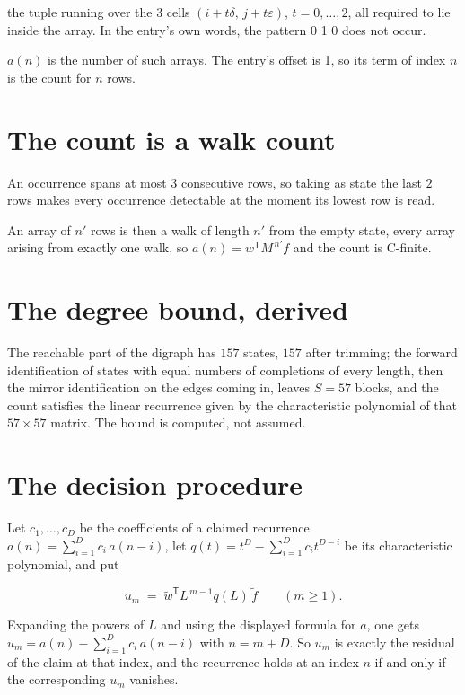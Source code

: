 \documentclass[11pt]{article}
\theoremstyle{definition}
\begin{document}
the tuple running over the $3$ cells $(i+t\delta,\,j+t\varepsilon)$, $t = 0,\dots,2$, all required to lie inside the array. In the entry's own words, the pattern 0 1 0 does not occur.

$a(n)$ is the number of such arrays. The entry's offset is 1, so its term of index $n$ is the count for $n$ rows.

\section{The count is a walk count}

An occurrence spans at most $3$ consecutive rows, so taking as state the last $2$ rows makes every occurrence detectable at the moment its lowest row is read.

An array of $n'$ rows is then a walk of length $n'$ from the empty state, every array arising from exactly one walk, so $a(n) = w^{\mathsf T}M^{\,n'}f$ and the count is C-finite.

\section{The degree bound, derived}

The reachable part of the digraph has $157$ states, $157$ after trimming; the forward identification of states with equal numbers of completions of every length, then the mirror identification on the edges coming in, leaves $S = 57$ blocks, and the count satisfies the linear recurrence given by the characteristic polynomial of that $57\times57$ matrix. The bound is computed, not assumed.

\section{The decision procedure}

Let $c_1,\dots,c_D$ be the coefficients of a claimed recurrence $a(n) = \sum_{i=1}^{D} c_i\,a(n-i)$, let $q(t) = t^{D} - \sum_{i=1}^{D} c_i t^{D-i}$ be its characteristic polynomial, and put

\[u_m \;=\; \tilde w^{\mathsf T} L^{\,m-1} q(L)\,\tilde f \qquad (m \ge 1).\]

Expanding the powers of $L$ and using the displayed formula for $a$, one gets $u_m = a(n) - \sum_{i=1}^{D} c_i\,a(n-i)$ with $n = m + D$. So $u_m$ is exactly the residual of the claim at that index, and the recurrence holds at an index $n$ if and only if the corresponding $u_m$ vanishes.
\end{document}
